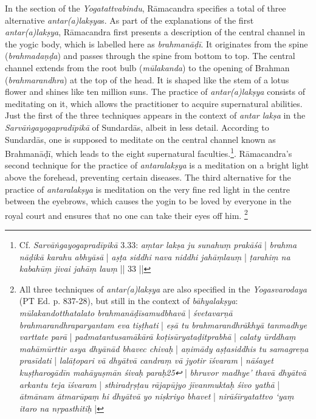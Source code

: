 In the  section of the \textit{Yogatattvabindu}, Rāmacandra specifies a total of three alternative \textit{antar(a)lakṣya}s. 
As part of the explanations of the first \textit{antar(a)lakṣya}, Rāmacandra first presents a description of the central channel in the yogic body, which is labelled here as \textit{brahmanāḍī}. It originates from the spine (\textit{brahmadaṇḍa}) and passes through the spine from bottom to top. The central channel extends from the root bulb (\textit{mūlakanda}) to the opening of Brahman (\textit{brahmarandhra}) at the top of the head. It is shaped like the stem of a lotus flower and shines like ten million suns. The practice of \textit{antar(a)lakṣya} consists of meditating on it, which allows the practitioner to acquire supernatural abilities. Just the first of the three techniques appears in the context of \textit{antar lakṣa} in the \textit{Sarvāṅgayogapradīpikā} of Sundardās, albeit in less detail. According to Sundardās, one is supposed to meditate on the central channel known as Brahmanāḍī, which leads to the eight supernatural faculties.\footnote{Cf. \textit{Sarvāṅgayogapradīpikā} 3.33: \textit{aṃtar lakṣa ju sunahuṃ prakāśā} | \textit{brahma nāḍikā karahu abhyāsā} | \textit{aṣṭa siddhi nava niddhi jahāṃlauṃ} | \textit{ṭarahiṃ na kabahūṃ jivai jahāṃ lauṃ} || 33 ||}.
Rāmacandra’s second technique for the practice of \textit{antaralakṣya} is a meditation on a bright light above the forehead, preventing certain diseases.
The third alternative for the practice of \textit{antaralakṣya} is meditation on the very fine red light in the centre between the eyebrows, which causes the yogin to be loved by everyone in the royal court and ensures that no one can take their eyes off him. \footnote{All three techniques of \textit{antar(a)lakṣya} are also specified in the \textit{Yogasvarodaya} (PT Ed. p. 837-28), but still in the context of \textit{bāhyalakṣya}: \textit{mūlakandotthatalato brahmanāḍīsamudbhavā} | \textit{śvetavarṇā brahmarandhraparyantam eva tiṣṭhati} | \textit{eṣā tu brahmarandhrākhyā tanmadhye varttate parā} | \textit{padmatantusamākārā koṭisūryataḍitprabhā} | \textit{calaty ūrddhaṃ mahāmūrttir asya dhyānād bhavec chivaḥ} | \textit{aṇimādy aṣṭasiddhis tu samagreṇa prasīdati} | \textit{lalāṭopari vā dhyātvā candraṃ vā jyotir īśvaram} | \textit{nāśayet kuṣṭharogādīn mahāyuṣmān śivaḥ paraḥ25↩} | \textit{bhruvor madhye’ thavā dhyātvā arkantu teja īśvaram} | \textit{sthiradṛṣṭau rājapūjyo jīvanmuktaḥ śivo yathā} | \textit{ātmānam ātmarūpaṃ hi dhyātvā yo niṣkriyo bhavet} | \textit{nirāśīryatattvo ‘yaṃ itaro na nṛpasthitiḥ} |}  

